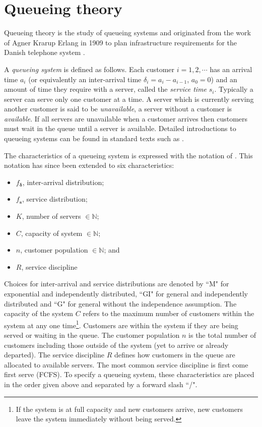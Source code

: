 \documentclass[article]{jss}
\begin{document}
\section{Queueing theory} \label{sec:queueing}

Queueing theory is the study of queueing systems and originated from the work of Agner Krarup Erlang in 1909 to plan infrastructure requirements for the Danish telephone system \citep[pg 2]{thomopoulos2012fundamentals}. 

A \textit{queueing system} is defined as follows. Each customer $i = 1,2,\cdots$ has an arrival time $a_i$ (or equivalently an inter-arrival time $\delta_i = a_i - a_{i-1}$, $a_0 = 0$) and an amount of time they require with a server, called the \textit{service time} $s_i$. Typically a server can serve only one customer at a time. A server which is currently serving another customer is said to be \textit{unavailable}, a server without a customer is \textit{available}. If all servers are unavailable when a customer arrives then customers must wait in the queue until a server is available. Detailed introductions to queueing systems can be found in standard texts such as \citet{bhat2015introduction}. 

The characteristics of a queueing system is expressed with the notation of \citet{kendall1953stochastic}. This notation has since been extended to six characteristics:
\begin{itemize}
\item $f_{\mathbf{\delta}}$, inter-arrival distribution;
\item $f_{\mathbf{s}}$, service distribution; 
\item $K$, number of servers $\in \mathbb{N}$;
\item $C$, capacity of system $\in \mathbb{N}$; 
\item $n$, customer population $\in \mathbb{N}$; and
\item $R$, service discipline
\end{itemize}

Choices for inter-arrival and service distributions are denoted by ``M" for exponential and independently distributed, ``GI" for general and independently distributed and ``G" for general without the independence assumption. The capacity of the system $C$ refers to the maximum number of customers within the system at any one time\footnote{If the system is at full capacity and new customers arrive, new customers leave the system immediately without being served.}. Customers are within the system if they are being served or waiting in the queue. The customer population $n$ is the total number of customers including those outside of the system (yet to arrive or already departed). The service discipline $R$ defines how customers in the queue are allocated to available servers. The most common service discipline is first come first serve (FCFS). To specify a queueing system, these characteristics are placed in the order given above and separated by a forward slash ``/". 
\end{document}
